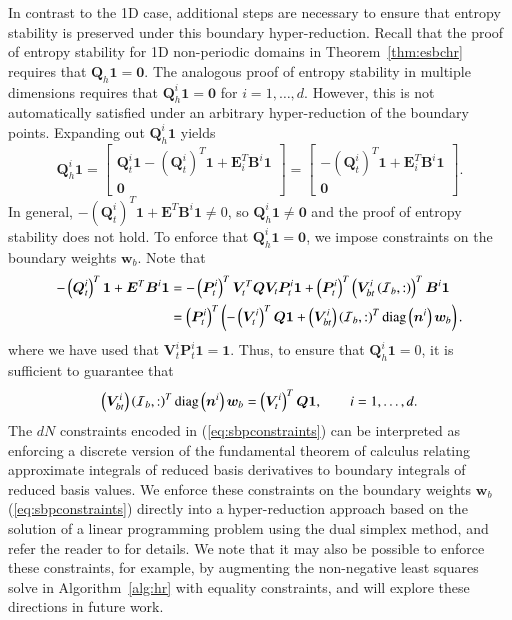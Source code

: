 \documentclass[preprint,10pt]{elsarticle}
\theoremstyle{definition}
\theoremstyle{lemma}
\theoremstyle{theorem}
\theoremstyle{assumption}
\newcommand{\LRp}[1]{\left( #1 \right)}
\begin{document}
In contrast to the 1D case, additional steps are necessary to ensure that entropy stability is preserved under this boundary hyper-reduction.  Recall that the proof of entropy stability for 1D non-periodic domains in Theorem~\ref{thm:esbchr} requires that $\bm{Q}_h\bm{1} = \bm{0}$.  The analogous proof of entropy stability in multiple dimensions requires that $\bm{Q}^i_h\bm{1} = \bm{0}$ for $i = 1,\ldots, d$.  However, this is not automatically satisfied under an arbitrary hyper-reduction of the boundary points.  Expanding out $\bm{Q}^i_h\bm{1}$ yields
\[
\bm{Q}^i_h\bm{1} = \begin{bmatrix}
\bm{Q}^i_t\bm{1} - \LRp{\bm{Q}^i_t}^T\bm{1} + \bm{E}_i^T\bm{B}^i \bm{1}\\
\bm{0}
\end{bmatrix}= \begin{bmatrix}
-\LRp{\bm{Q}^i_t}^T\bm{1} + \bm{E}_i^T\bm{B}^i \bm{1}\\
\bm{0}
\end{bmatrix}.
\]
In general, $-\LRp{\bm{Q}^i_t}^T\bm{1} + \bm{E}^T\bm{B}^i \bm{1}\neq 0$, so $\bm{Q}^i_h\bm{1} \neq \bm{0}$ and the proof of entropy stability does not hold.  To enforce that $\bm{Q}^i_h\bm{1} = \bm{0}$, we impose constraints on the boundary weights $\bm{w}_b$.  Note that 
\begin{align*}
-\LRp{\bm{Q}^i_t}^T\bm{1} + \bm{E}^T\bm{B}^i \bm{1} &= -\LRp{\bm{P}^i_t}^T\bm{V}_t^T\bm{Q}\bm{V}_t\bm{P}^i_t\bm{1} + \LRp{\bm{P}^i_t}^T\LRp{\bm{V}^i_{bt}\LRp{\mathcal{I}_b,:}}^T\bm{B}^i\bm{1}\\
&= \LRp{\bm{P}^i_t}^T\LRp{-\LRp{\bm{V}^i_t}^T\bm{Q}\bm{1} + \LRp{\bm{V}^i_{bt}}\LRp{\mathcal{I}_b,:}^T{\rm diag}\LRp{\bm{n}^i}\bm{w}_b}.
\end{align*}
where we have used that $\bm{V}^i_t\bm{P}^i_t\bm{1} = \bm{1}$.  Thus, to ensure that $\bm{Q}^i_h\bm{1} = 0$, it is sufficient to guarantee that
\begin{equation}
\LRp{\bm{V}^i_{bt}}\LRp{\mathcal{I}_b,:}^T{\rm diag}\LRp{\bm{n}^i}\bm{w}_b = \LRp{\bm{V}^i_t}^T\bm{Q}\bm{1}, \qquad i = 1,\ldots, d.
\label{eq:sbpconstraints}
\end{equation}
The $dN$ constraints encoded in (\ref{eq:sbpconstraints}) can be interpreted as enforcing a discrete version of the fundamental theorem of calculus relating approximate integrals of reduced basis derivatives to boundary integrals of reduced basis values.  We enforce these constraints on the boundary weights $\bm{w}_b$ (\ref{eq:sbpconstraints}) directly into a hyper-reduction approach based on the solution of a linear programming problem using the dual simplex method, and refer the reader to \cite{yano2019lp} for details.  We note that it may also be possible to enforce these constraints, for example, by augmenting the non-negative least squares solve in Algorithm~\ref{alg:hr} with equality constraints, and will explore these directions in future work.  
\end{document}
